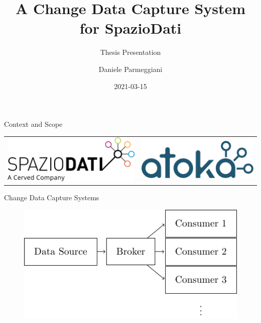 \documentclass[aspectratio=169]{beamer}
\title{A Change Data Capture System for SpazioDati}
\subtitle{Thesis Presentation}
\date{2021-03-15}
\institute{Università degli Studi di Trento}
\author{Daniele Parmeggiani}
\theoremstyle{definition}
\theoremstyle{remark}
\begin{document}
\inserttitleframe
{}

\begin{frame}{Context and Scope}
	\begin{center}
	\begin{tabular}{cc}
		\includegraphics[width=.45\linewidth]{spaziodati.png} \hspace*{1cm} & \includegraphics[width=.4\linewidth]{atoka.pdf}
	\end{tabular}
	\end{center}
\end{frame}

\begin{frame}{Change Data Capture Systems}
	\begin{figure}
		\centering
		\includegraphics[width=0.7\linewidth]{../figures/introduction/cdc-generic}
	\end{figure}
\end{frame}
\end{document}
